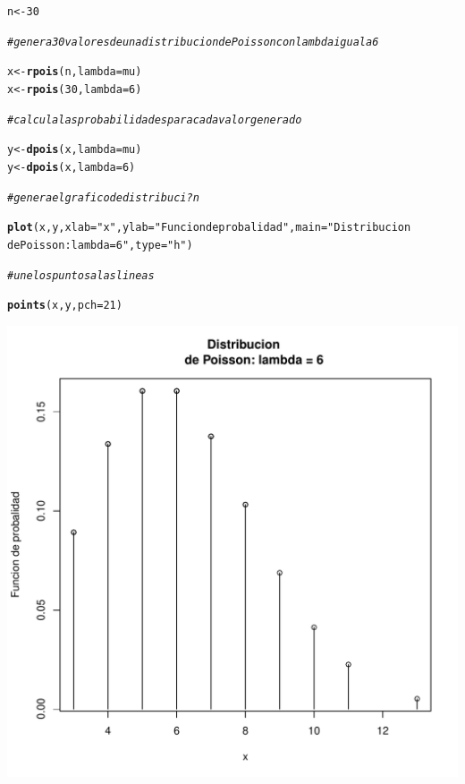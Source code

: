 \documentclass[12pt,letterpaper]{article}\usepackage[]{graphicx}\usepackage[]{color}
\makeatletter
\def\maxwidth{ %
  \ifdim\Gin@nat@width>\linewidth
    \linewidth
  \else
    \Gin@nat@width
  \fi
}
\newcommand{\hlnum}[1]{\textcolor[rgb]{0.686,0.059,0.569}{#1}}%
\newcommand{\hlstr}[1]{\textcolor[rgb]{0.192,0.494,0.8}{#1}}%
\newcommand{\hlcom}[1]{\textcolor[rgb]{0.678,0.584,0.686}{\textit{#1}}}%
\newcommand{\hlstd}[1]{\textcolor[rgb]{0.345,0.345,0.345}{#1}}%
\newcommand{\hlkwb}[1]{\textcolor[rgb]{0.69,0.353,0.396}{#1}}%
\newcommand{\hlkwc}[1]{\textcolor[rgb]{0.333,0.667,0.333}{#1}}%
\newcommand{\hlkwd}[1]{\textcolor[rgb]{0.737,0.353,0.396}{\textbf{#1}}}%
\newenvironment{kframe}{%
 \def\at@end@of@kframe{}%
 \ifinner\ifhmode%
  \def\at@end@of@kframe{\end{minipage}}%
  \begin{minipage}{\columnwidth}%
 \fi\fi%
 \def\FrameCommand##1{\hskip\@totalleftmargin \hskip-\fboxsep
 \colorbox{shadecolor}{##1}\hskip-\fboxsep
     \hskip-\linewidth \hskip-\@totalleftmargin \hskip\columnwidth}%
 \MakeFramed {\advance\hsize-\width
   \@totalleftmargin\z@ \linewidth\hsize
   \@setminipage}}%
 {\par\unskip\endMakeFramed%
 \at@end@of@kframe}
\newenvironment{knitrout}{}{} %
\makeatother
\begin{document}
\begin{itemize}
\begin{knitrout}
\color{fgcolor}\begin{kframe}
\begin{alltt}
\hlstd{n} \hlkwb{<-} \hlnum{30}

\hlcom{# genera 30 valores de una distribucion de Poisson con lambda igual a 6 }

\hlstd{x} \hlkwb{<-} \hlkwd{rpois}\hlstd{(n,} \hlkwc{lambda}\hlstd{=mu)}
\hlstd{x} \hlkwb{<-} \hlkwd{rpois}\hlstd{(}\hlnum{30}\hlstd{,} \hlkwc{lambda}\hlstd{=}\hlnum{6}\hlstd{)}

\hlcom{#calcula las probabilidades para cada valor generado }

\hlstd{y} \hlkwb{<-} \hlkwd{dpois}\hlstd{(x,} \hlkwc{lambda}\hlstd{=mu)}
\hlstd{y} \hlkwb{<-} \hlkwd{dpois}\hlstd{(x,} \hlkwc{lambda}\hlstd{=}\hlnum{6}\hlstd{)}


\hlcom{#genera el grafico de distribuci?n}

\hlkwd{plot}\hlstd{(x, y,} \hlkwc{xlab}\hlstd{=}\hlstr{"x"}\hlstd{,} \hlkwc{ylab}\hlstd{=}\hlstr{"Funcion de probalidad"}\hlstd{,} \hlkwc{main}\hlstd{=}\hlstr{"Distribucion 
     de Poisson: lambda = 6"}\hlstd{,} \hlkwc{type}\hlstd{=}\hlstr{"h"}\hlstd{)}

\hlcom{#une los puntos a las lineas}

\hlkwd{points}\hlstd{(x, y,} \hlkwc{pch}\hlstd{=}\hlnum{21}\hlstd{)}
\end{alltt}
\end{kframe}
\includegraphics[width=\maxwidth]{figure/unnamed-chunk-23-1} 


\end{knitrout}
\end{itemize}
\end{document}
